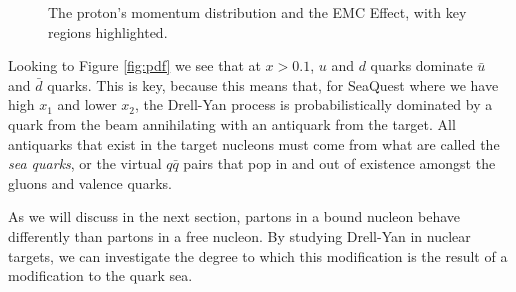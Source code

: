 \begin{figure}
	\centering
	\hspace{8pt}%
	\caption{The proton's momentum distribution and the EMC Effect, with key regions highlighted.}
	\label{fig:pdf_emc}
\end{figure}

Looking to Figure \ref{fig:pdf} we see that at $x>0.1$, $u$ and $d$ quarks dominate $\bar{u}$ and $\bar{d}$ quarks.  This is key, because this means that, for SeaQuest where we have high $x_1$ and lower $x_2$, the Drell-Yan process is probabilistically dominated by a quark from the beam annihilating with an antiquark from the target. All antiquarks that exist in the target nucleons must come from what are called the \emph{sea quarks}, or the virtual $q\bar{q}$ pairs that pop in and out of existence amongst the gluons and valence quarks. 

As we will discuss in the next section, partons in a bound nucleon behave differently than partons in a free nucleon. By studying Drell-Yan in nuclear targets, we can investigate the degree to which this modification is the result of a modification to the quark sea.

